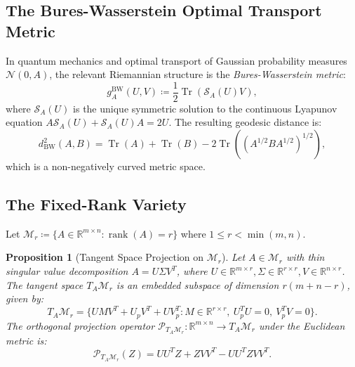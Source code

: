 \documentclass[11pt,a4paper,reqno]{amsart}
\newtheorem{proposition}[theorem]{Proposition}
\theoremstyle{definition}
\numberwithin{equation}{section}
\newcommand{\R}{\mathbb{R}}
\newcommand{\Tr}{\operatorname{Tr}}
\newcommand{\rank}{\operatorname{rank}}
\begin{document}
\subsection{The Bures-Wasserstein Optimal Transport Metric}
In quantum mechanics and optimal transport of Gaussian probability measures $\mathcal{N}(0, A)$, the relevant Riemannian structure is the \emph{Bures-Wasserstein metric}:
\begin{equation}
    \label{eq:bures_metric}
    g_A^{\mathrm{BW}}(U, V) \coloneqq \frac{1}{2} \Tr(\mathcal{S}_A(U) V),
\end{equation}
where $\mathcal{S}_A(U)$ is the unique symmetric solution to the continuous Lyapunov equation $A \mathcal{S}_A(U) + \mathcal{S}_A(U) A = 2 U$. The resulting geodesic distance is:
\begin{equation}
    d_{\mathrm{BW}}^2(A, B) = \Tr(A) + \Tr(B) - 2 \Tr\left((A^{1/2} B A^{1/2})^{1/2}\right),
\end{equation}
which is a non-negatively curved metric space.

\subsection{The Fixed-Rank Variety}
\label{subsec:fixed_rank}
Let $\mathcal{M}_r \coloneqq \{A \in \R^{m \times n} \colon \rank(A) = r\}$ where $1 \le r < \min(m, n)$.

\begin{proposition}[Tangent Space Projection on $\mathcal{M}_r$]
\label{prop:tangent_proj_mr}
Let $A \in \mathcal{M}_r$ with thin singular value decomposition $A = U \Sigma V^T$, where $U \in \R^{m \times r}, \Sigma \in \R^{r \times r}, V \in \R^{n \times r}$. The tangent space $T_A \mathcal{M}_r$ is an embedded subspace of dimension $r(m + n - r)$, given by:
\begin{equation}
    T_A \mathcal{M}_r = \{ U M V^T + U_p V^T + U V_p^T \colon M \in \R^{r \times r}, \ U_p^T U = 0, \ V_p^T V = 0 \}.
\end{equation}
The orthogonal projection operator $\mathcal{P}_{T_A \mathcal{M}_r} \colon \R^{m \times n} \to T_A \mathcal{M}_r$ under the Euclidean metric is:
\begin{equation}
    \label{eq:tangent_proj_formula}
    \mathcal{P}_{T_A \mathcal{M}_r}(Z) = U U^T Z + Z V V^T - U U^T Z V V^T.
\end{equation}
\end{proposition}
\end{document}
